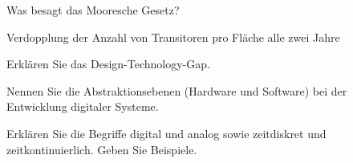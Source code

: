\documentclass
[
  draft    = true,
  fontsize = 11pt,
  parskip  = half-,
  BCOR     = 0pt,
  DIV      = 11,
  ngerman,
  dvipsnames
]
{scrartcl}
\begin{document}
\begin{mytemize}
  \item Was besagt das Mooresche Gesetz? 
        \begin{achim}
          \begin{mytemize}
            \item Verdopplung der Anzahl von Transitoren pro Fläche alle zwei Jahre
          \end{mytemize}
        \end{achim}
  \item Erklären Sie das \glqq{}Design-Technology-Gap\grqq. 
        \begin{achim}
          \begin{mytemize}
            \item 
          \end{mytemize}
        \end{achim}
  \item Nennen Sie die Abstraktionsebenen (Hardware und Software) bei der Entwicklung digitaler Systeme. 
        \begin{achim}
          \begin{center}
          \end{center}
        \end{achim}
  \item Erklären Sie die Begriffe \glqq{}digital\grqq{} und \glqq{}analog\grqq{} sowie \glqq{}zeitdiskret\grqq{} und \glqq{}zeitkontinuierlich\grqq. Geben Sie Beispiele. 
        \begin{achim}

\end{achim}
\end{mytemize}
\end{document}
